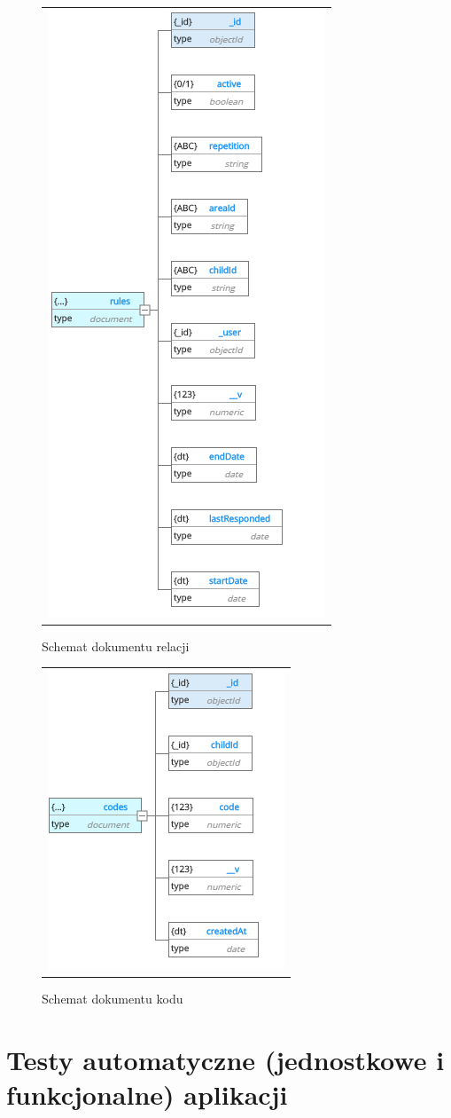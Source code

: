 \documentclass{sprawozdanie-agh}
\begin{document}
			\begin{figure}[H] 
				\centering 
				\begin{tabular}{c}
					\includegraphics[]{rules.png} 
				\end{tabular} 
				\caption{Schemat dokumentu relacji}
			\end{figure}

			\begin{figure}[H] 
				\centering 
				\begin{tabular}{c}
					\includegraphics[]{codes.png} 
				\end{tabular} 
				\caption{Schemat dokumentu kodu}
			\end{figure}



	\section{Testy automatyczne (jednostkowe i funkcjonalne) aplikacji}
	
\end{document}
